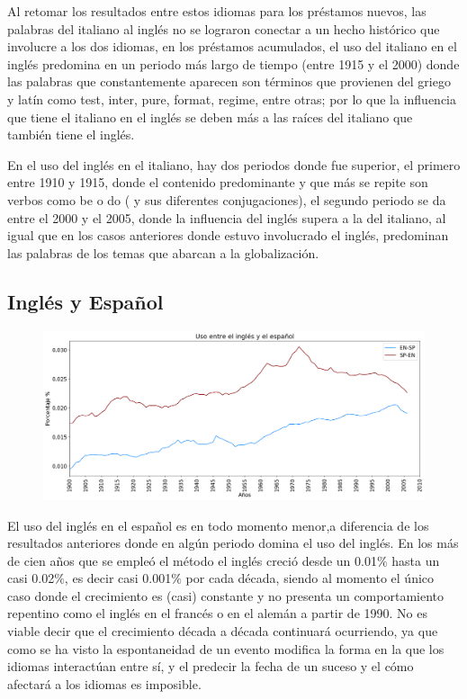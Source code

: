 Al retomar los resultados entre estos idiomas para los préstamos nuevos, las palabras del italiano al inglés no se lograron conectar a un hecho histórico que involucre a los dos idiomas, en los préstamos acumulados, el uso del italiano en el inglés predomina en un periodo más largo de tiempo (entre 1915 y el 2000) donde las palabras que constantemente aparecen son términos que provienen del griego y latín como test, inter, pure, format, regime, entre otras;  por lo que la influencia que tiene el italiano en el inglés se deben más a las raíces del italiano que también tiene el inglés.  

En el uso del inglés en el italiano,  hay dos periodos donde fue superior, el primero entre 1910 y 1915, donde el contenido predominante y que más se repite son verbos como be o do ( y sus diferentes conjugaciones),  el segundo periodo se da entre el 2000 y el 2005, donde la influencia del inglés supera a la del italiano, al igual que en los casos anteriores donde estuvo involucrado el inglés, predominan las palabras de los temas que abarcan a la globalización. 


\newpage
\subsection{Inglés y Español}

\begin{figure}[h!]
	\centering
	\includegraphics[scale=.38]{Cap_3/SF_4_S2_EN.png}
	\label{SF_ES}
	\caption{}
\end{figure}

El uso del inglés en el español es en todo momento menor,a diferencia de los resultados anteriores donde en algún periodo domina el uso del inglés.  En los más de cien años que se empleó el método el inglés creció desde un 0.01$\%$ hasta un casi 0.02$\%$, es decir casi 0.001$\%$ por cada década, siendo al momento el único caso donde el crecimiento es (casi) constante y no presenta un comportamiento repentino como el inglés en el francés o en el alemán a partir de 1990. No es viable decir que el crecimiento década a década continuará ocurriendo, ya que como se ha visto la espontaneidad de un evento modifica la forma en la que los idiomas interactúan entre sí, y el predecir la fecha de un suceso y el cómo afectará a los idiomas es imposible.  

